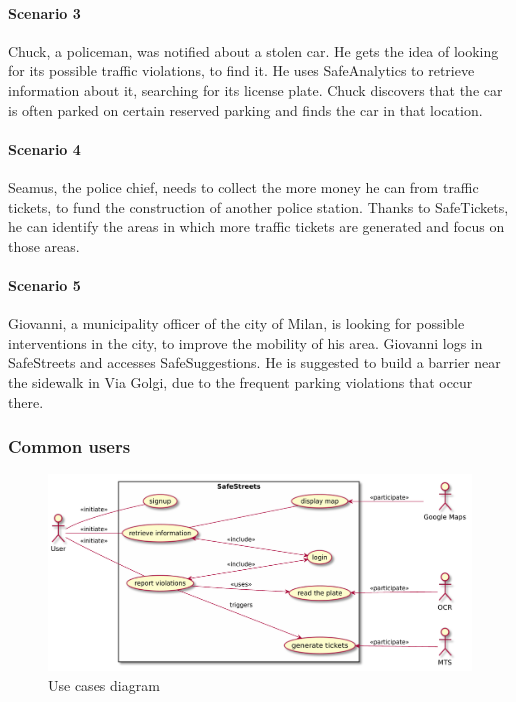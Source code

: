 \documentclass[a4paper]{article}
\begin{document}
\paragraph{Scenario 3}
Chuck, a policeman, was notified about a stolen car. He gets the idea of
looking for its possible traffic violations, to find it. He uses
SafeAnalytics to retrieve information about it, searching for its
license plate. Chuck discovers that the car is often parked on certain
reserved parking and finds the car in that location.

\paragraph{Scenario 4}
Seamus, the police chief, needs to collect the more money he can from
traffic tickets, to fund the construction of another police station.
Thanks to SafeTickets, he can identify the areas in which more traffic
tickets are generated and focus on those areas.

\paragraph{Scenario 5}
Giovanni, a municipality officer of the city of Milan, is looking for
possible interventions in the city, to improve the mobility of his area.
Giovanni logs in SafeStreets and accesses SafeSuggestions. He is
suggested to build a barrier near the sidewalk in Via Golgi, due to the
frequent parking violations that occur there.

\subsubsection{Common users}

\begin{figure}[H]
\centering
\includegraphics[width=\textwidth]{usecase_common_user.pdf}
\caption{Use cases diagram}
\end{figure}
\end{document}

